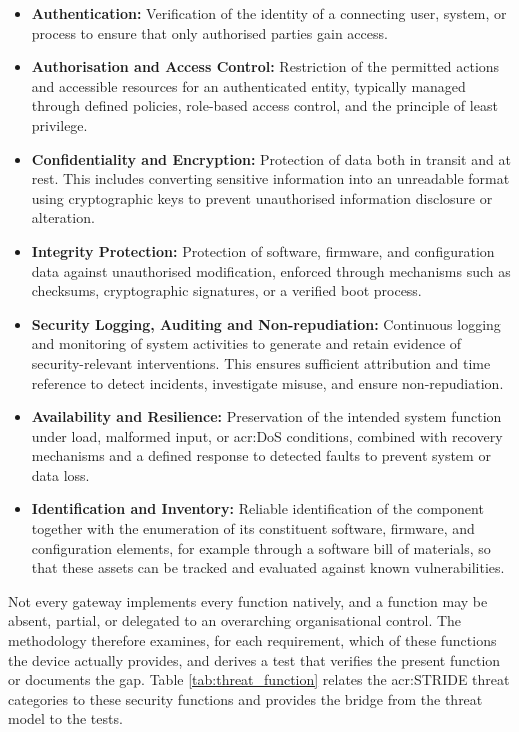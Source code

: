 \begin{itemize} 
	\item \textbf{Authentication:} Verification of the identity of a connecting user, system, or process to ensure that only authorised parties gain access. 
	\item \textbf{Authorisation and Access Control:} Restriction of the permitted actions and accessible resources for an authenticated entity, typically managed through defined policies, role-based access control, and the principle of least privilege. 
	\item \textbf{Confidentiality and Encryption:} Protection of data both in transit and at rest. This includes converting sensitive information into an unreadable format using cryptographic keys to prevent unauthorised information disclosure or alteration. 
	\item \textbf{Integrity Protection:} Protection of software, firmware, and configuration data against unauthorised modification, enforced through mechanisms such as checksums, cryptographic signatures, or a verified boot process. 
	\item \textbf{Security Logging, Auditing and Non-repudiation:} Continuous logging and monitoring of system activities to generate and retain evidence of security-relevant interventions. This ensures sufficient attribution and time reference to detect incidents, investigate misuse, and ensure non-repudiation. 
	\item \textbf{Availability and Resilience:} Preservation of the intended system function under load, malformed input, or \gls{acr:DoS} conditions, combined with recovery mechanisms and a defined response to detected faults to prevent system or data loss. 
	\item \textbf{Identification and Inventory:} Reliable identification of the component together with the enumeration of its constituent software, firmware, and configuration elements, for example through a software bill of materials, so that these assets can be tracked and evaluated against known vulnerabilities. 
\end{itemize} 

Not every gateway implements every function natively, and a function may be absent, partial, or delegated to an overarching organisational control. The methodology therefore examines, for each requirement, which of these functions the device actually provides, and derives a test that verifies the present function or documents the gap. Table \ref{tab:threat_function} relates the \gls{acr:STRIDE} threat categories to these security functions and provides the bridge from the threat model to the tests. 

